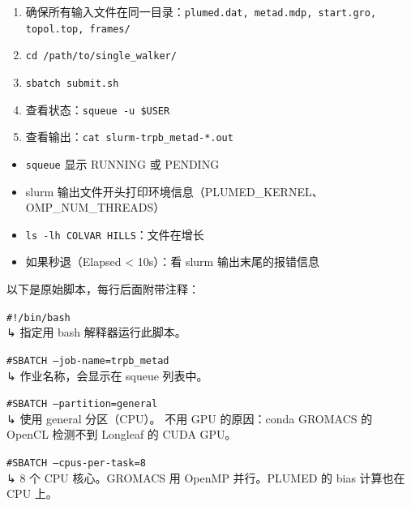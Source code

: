 \documentclass[11pt,a4paper]{article}
\begin{document}
\begin{iobox}[使用方法]
\begin{enumerate}[nosep]
\item 确保所有输入文件在同一目录：\texttt{plumed.dat, metad.mdp, start.gro, topol.top, frames/}
\item \texttt{cd /path/to/single\_walker/}
\item \texttt{sbatch submit.sh}
\item 查看状态：\texttt{squeue -u \$USER}
\item 查看输出：\texttt{cat slurm-trpb\_metad-*.out}
\end{enumerate}
\end{iobox}

\begin{iobox}[怎么确认提交成功]
\begin{itemize}[nosep]
\item \texttt{squeue} 显示 RUNNING 或 PENDING
\item slurm 输出文件开头打印环境信息（PLUMED\_KERNEL、OMP\_NUM\_THREADS）
\item \texttt{ls -lh COLVAR HILLS}：文件在增长
\item 如果秒退（Elapsed < 10s）：看 slurm 输出末尾的报错信息
\end{itemize}
\end{iobox}

\vspace{5pt}

\noindent 以下是原始脚本，每行后面附带注释：

\vspace{5pt}

\noindent\texttt{\textcolor{paramcolor}{\#!/bin/bash}}\\
\textcolor{notecolor}{↳ 指定用 bash 解释器运行此脚本。}

\vspace{3pt}
\noindent\texttt{\textcolor{paramcolor}{\#SBATCH --job-name=trpb\_metad}}\\
\textcolor{notecolor}{↳ 作业名称，会显示在 squeue 列表中。}

\vspace{3pt}
\noindent\texttt{\textcolor{paramcolor}{\#SBATCH --partition=general}}\\
\textcolor{notecolor}{↳ 使用 general 分区（CPU）。} \textcolor{warncolor}{不用 GPU 的原因：conda GROMACS 的 OpenCL 检测不到 Longleaf 的 CUDA GPU。}

\vspace{3pt}
\noindent\texttt{\textcolor{paramcolor}{\#SBATCH --cpus-per-task=8}}\\
\textcolor{notecolor}{↳ 8 个 CPU 核心。GROMACS 用 OpenMP 并行。PLUMED 的 bias 计算也在 CPU 上。}
\end{document}
